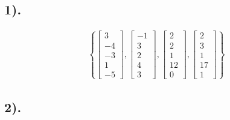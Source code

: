 \documentclass{article}
\begin{document}
\subsection{1).}

\begin{align*}
	\left\{
		\begin{bmatrix} 3 \\ -4 \\ -3 \\ 1 \\ -5 \end{bmatrix},
		\begin{bmatrix} -1 \\ 3 \\ 2 \\ 4 \\ 3 \end{bmatrix},
		\begin{bmatrix} 2 \\ 2 \\ 1 \\ 12 \\ 0 \end{bmatrix},
		\begin{bmatrix} 2 \\ 3 \\ 1 \\ 17 \\ 1 \end{bmatrix}
	\right\}
\end{align*}

\subsection{2).}
\end{document}

